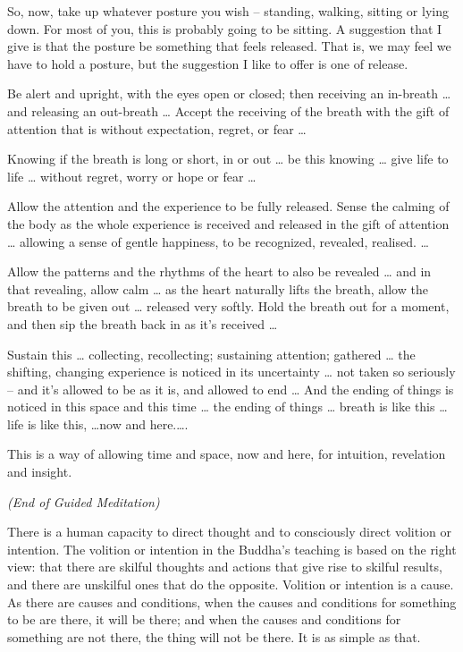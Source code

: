 So, now, take up whatever posture you wish -- standing, walking, sitting or
lying down. For most of you, this is probably going to be sitting. A suggestion
that I give is that the posture be something that feels released. That is, we
may feel we have to hold a posture, but the suggestion I like to offer is one of
release.

Be alert and upright, with the eyes open or closed; then receiving an in-breath
\ldots{} and releasing an out-breath \ldots{} Accept the receiving of the breath
with the gift of attention that is without expectation, regret, or fear \ldots{}

Knowing if the breath is long or short, in or out \ldots{} be this knowing
\ldots{} give life to life \ldots{} without regret, worry or hope or fear
\ldots{}

Allow the attention and the experience to be fully released. Sense the calming
of the body as the whole experience is received and released in the gift of
attention \ldots{} allowing a sense of gentle happiness, to be recognized,
revealed, realised. \ldots{}

Allow the patterns and the rhythms of the heart to also be revealed \ldots{} and
in that revealing, allow calm \ldots{} as the heart naturally lifts the breath,
allow the breath to be given out \ldots{} released very softly. Hold the breath
out for a moment, and then sip the breath back in as it's received \ldots{}

Sustain this \ldots{} collecting, recollecting; sustaining attention; gathered
\ldots{} the shifting, changing experience is noticed in its uncertainty
\ldots{} not taken so seriously -- and it's allowed to be as it is, and allowed
to end \ldots{} And the ending of things is noticed in this space and this time
\ldots{} the ending of things \ldots{} breath is like this \ldots{} life is like
this, \ldots now and here.\ldots.

This is a way of allowing time and space, now and here, for intuition,
revelation and insight.

\bigskip

{\centering
\textit{(End of Guided Meditation)}
\par}

\bigskip

There is a human capacity to direct thought and to consciously direct volition
or intention. The volition or intention in the Buddha's teaching is based on the
right view: that there are skilful thoughts and actions that give rise to
skilful results, and there are unskilful ones that do the opposite. Volition or
intention is a cause. As there are causes and conditions, when the causes and
conditions for something to be are there, it will be there; and when the causes
and conditions for something are not there, the thing will not be there. It is
as simple as that.


